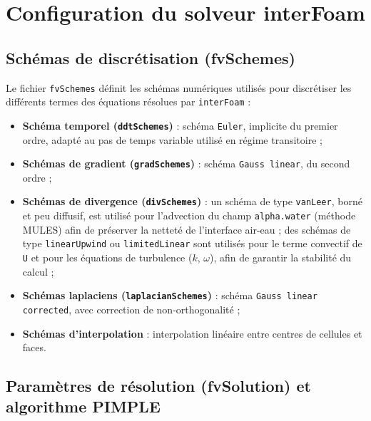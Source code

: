 \section{Configuration du solveur interFoam}
\label{sec:configuration_solveur}

\subsection{Schémas de discrétisation (fvSchemes)}
\label{subsec:fvschemes}

Le fichier \texttt{fvSchemes} définit les schémas numériques utilisés pour discrétiser les différents termes des équations résolues par \texttt{interFoam} \cite{rusche2002computational} :
\begin{itemize}
    \item \textbf{Schéma temporel (\texttt{ddtSchemes})} : schéma \texttt{Euler}, implicite du premier ordre, adapté au pas de temps variable utilisé en régime transitoire ;
    \item \textbf{Schémas de gradient (\texttt{gradSchemes})} : schéma \texttt{Gauss linear}, du second ordre ;
    \item \textbf{Schémas de divergence (\texttt{divSchemes})} : un schéma de type \texttt{vanLeer}, borné et peu diffusif, est utilisé pour l'advection du champ \texttt{alpha.water} (méthode MULES) afin de préserver la netteté de l'interface air-eau ; des schémas de type \texttt{linearUpwind} ou \texttt{limitedLinear} sont utilisés pour le terme convectif de \texttt{U} et pour les équations de turbulence ($k$, $\omega$), afin de garantir la stabilité du calcul ;
    \item \textbf{Schémas laplaciens (\texttt{laplacianSchemes})} : schéma \texttt{Gauss linear corrected}, avec correction de non-orthogonalité ;
    \item \textbf{Schémas d'interpolation} : interpolation linéaire entre centres de cellules et faces.
\end{itemize}

\subsection{Paramètres de résolution (fvSolution) et algorithme PIMPLE}
\label{subsec:fvsolution}

